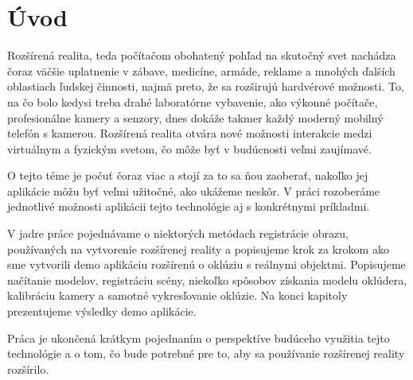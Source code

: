 \chapter*{Úvod}
Rozšírená realita, teda počítačom obohatený pohľad na skutočný svet nachádza čoraz väčšie uplatnenie v zábave, medicíne, armáde, reklame a mnohých ďalších oblastiach ľudskej činnosti, najmä preto, že sa rozširujú hardvérové možnosti. To, na čo bolo kedysi treba drahé laboratórne vybavenie, ako výkonné počítače, profesionálne kamery a senzory, dnes dokáže takmer každý moderný mobilný telefón s kamerou. Rozšírená realita otvára nové možnosti interakcie medzi virtuálnym a fyzickým svetom, čo môže byť v budúcnosti veľmi zaujímavé.

O tejto téme je počuť čoraz viac a stojí za to sa ňou zaoberať, nakoľko jej aplikácie môžu byť veľmi užitočné, ako ukážeme neskôr. V práci rozoberáme jednotlivé možnosti aplikácii tejto technológie aj s konkrétnymi príkladmi.

V jadre práce pojednávame o niektorých metódach registrácie obrazu, používaných na vytvorenie rozšírenej reality a popisujeme krok za krokom ako sme vytvorili demo aplikáciu rozšírenú o oklúziu s reálnymi objektmi. Popisujeme načítanie modelov, registráciu scény, niekoľko spôsobov získania modelu oklúdera, kalibráciu kamery a samotné vykresľovanie oklúzie. Na konci kapitoly prezentujeme výsledky demo aplikácie.

Práca je ukončená krátkym pojednaním o perspektíve budúceho využitia tejto technológie a o tom, čo bude potrebné pre to, aby sa používanie rozšírenej reality
rozšírilo.